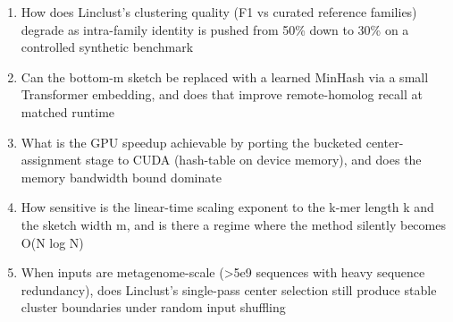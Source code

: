 \documentclass[11pt]{article}
\begin{document}
\begin{enumerate}[leftmargin=1.6em,itemsep=0.2em,topsep=0.2em,label=Q\arabic*.]
\item How does Linclust's clustering quality (F1 vs curated reference families) degrade as intra-family identity is pushed from 50\% down to 30\% on a controlled synthetic benchmark
\item Can the bottom-m sketch be replaced with a learned MinHash via a small Transformer embedding, and does that improve remote-homolog recall at matched runtime
\item What is the GPU speedup achievable by porting the bucketed center-assignment stage to CUDA (hash-table on device memory), and does the memory bandwidth bound dominate
\item How sensitive is the linear-time scaling exponent to the k-mer length k and the sketch width m, and is there a regime where the method silently becomes O(N log N)
\item When inputs are metagenome-scale (\textgreater{}5e9 sequences with heavy sequence redundancy), does Linclust's single-pass center selection still produce stable cluster boundaries under random input shuffling
\end{enumerate}
\end{document}
